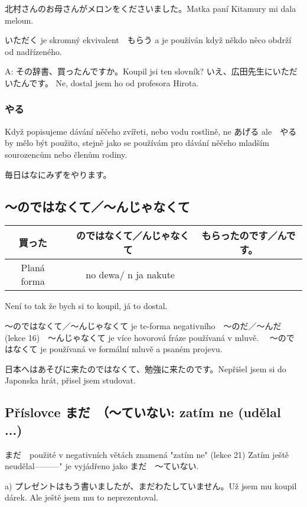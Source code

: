 北村さんのお母さんがメロンをくださいました。Matka paní Kitamury mi dala meloun.

いただく je skromný ekvivalent　もらう a je používán když někdo něco obdrží od nadřízeného.

A: その辞書、買ったんですか。Koupil jsi ten slovník?
いえ、広田先生にいただいたんです。 Ne, dostal jsem ho od profesora Hirota.

\subsubsection{やる}

Když popisujeme dávání něčeho zvířeti, nebo vodu rostlině, ne あげる ale　やる by mělo být použito, stejně jako se používám pro dávání něčeho mladším sourozencům nebo členům rodiny.


毎日はなにみずをやります。

\subsection{〜のではなくて／〜んじゃなくて}
\begin{center}
\begin{tabular}{||c|c||c||}
\hline
買った&　のではなくて／んじゃなくて　&もらったのです／んです。\\
\hline
Planá forma & no dewa/ n ja nakute& \\
\hline
\end{tabular}
\end{center}
Není to tak že bych si to koupil, já to dostal.


〜のではなくて／〜んじゃなくて je te-forma negativního　〜のだ／〜んだ (lekce 16)　〜んじゃなくて je více hovorová fráze používaná v mluvě. 　〜のではなくて je používaná ve formální mluvě a psaném projevu.

日本へはあそびに来たのではなくて、勉強に来たのです。Nepřišel jsem si do Japonska hrát, přisel jsem studovat.


\subsection{Příslovce まだ　（〜ていない: zatím ne (udělal ...)}

まだ　použité v negativních větách znamená "zatím ne" (lekce 21) Zatím ještě neudělal---------" je vyjádřeno jako まだ　〜ていない.

a) プレゼントはもう書いましたが、まだわたしていません。Už jsem mu koupil dárek. Ale ještě jsem mu to neprezentoval.




